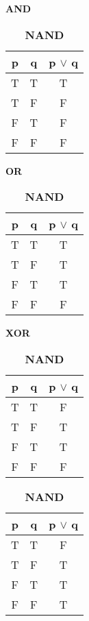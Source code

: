 \documentclass{article}
\numberwithin{theorem}{subsection}
\numberwithin{theorem}{subsubsection}
\theoremstyle{definition}
\numberwithin{definition}{subsection}
\numberwithin{definition}{subsubsection}
\begin{document}
\begin{table}[H]
    \begin{minipage}{.25\linewidth}
      \caption*{\textbf{AND}}
      \centering
        \begin{tabular}{c|c|c}
             p & q & p $\vee$ q\\
             \hline
             T & T & T \\
             T & F & F \\
             F & T & F \\
             F & F & F \\
        \end{tabular}
    \end{minipage}%
    \begin{minipage}{.25\linewidth}
      \centering
        \caption*{\textbf{OR}}
        \begin{tabular}{c|c|c}
             p & q & p $\vee$ q\\
             \hline
             T & T & T \\
             T & F & T \\
             F & T & T \\
             F & F & F \\
        \end{tabular}
    \end{minipage}%
    \begin{minipage}{.25\linewidth}
      \centering
        \caption*{\textbf{XOR}}
        \begin{tabular}{c|c|c}
             p & q & p $\vee$ q\\
             \hline
             T & T & F \\
             T & F & T \\
             F & T & T \\
             F & F & F \\
        \end{tabular}
    \end{minipage}%
    \begin{minipage}{.25\linewidth}
      \centering
        \caption*{\textbf{NAND}}
        \begin{tabular}{c|c|c}
             p & q & p $\vee$ q\\
             \hline
             T & T & F \\
             T & F & T \\
             F & T & T \\
             F & F & T \\
        \end{tabular}
    \end{minipage}%
\end{table}
\end{document}
